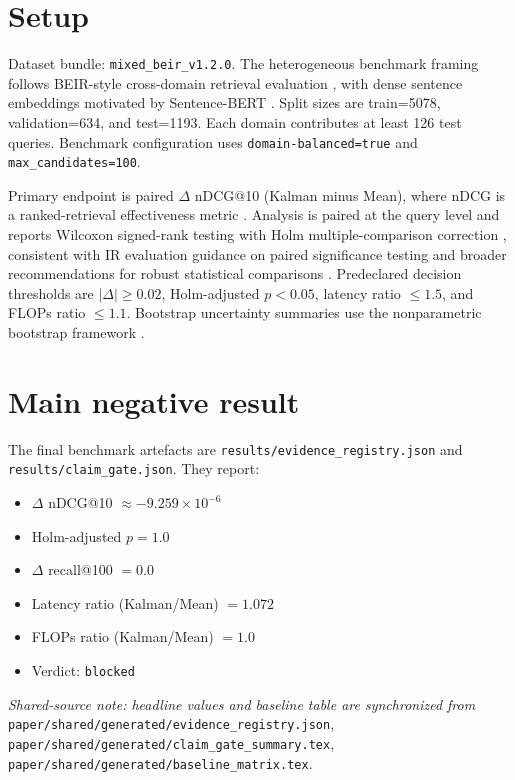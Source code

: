 \documentclass[11pt]{article}
\begin{document}
\section{Setup}
Dataset bundle: \texttt{mixed\_beir\_v1.2.0}. The heterogeneous benchmark framing follows BEIR-style cross-domain retrieval evaluation \cite{thakur2021beir}, with dense sentence embeddings motivated by Sentence-BERT \cite{reimers2019sentencebert}. Split sizes are train=5078, validation=634, and test=1193. Each domain contributes at least 126 test queries. Benchmark configuration uses \texttt{domain-balanced=true} and \texttt{max\_candidates=100}.

Primary endpoint is paired $\Delta$ nDCG@10 (Kalman minus Mean), where nDCG is a ranked-retrieval effectiveness metric \cite{jarvelin2002}. Analysis is paired at the query level and reports Wilcoxon signed-rank testing \cite{wilcoxon1945} with Holm multiple-comparison correction \cite{holm1979}, consistent with IR evaluation guidance on paired significance testing \cite{smucker2007comparison} and broader recommendations for robust statistical comparisons \cite{dror2018hitchhikers,demsar2006statistical}. Predeclared decision thresholds are $|\Delta|\ge 0.02$, Holm-adjusted $p<0.05$, latency ratio $\le 1.5$, and FLOPs ratio $\le 1.1$. Bootstrap uncertainty summaries use the nonparametric bootstrap framework \cite{efron1979bootstrap}.

\section{Main negative result}
The final benchmark artefacts are \texttt{results/evidence\_registry.json} and \texttt{results/claim\_gate.json}. They report:
\begin{itemize}
  \item $\Delta$ nDCG@10 $\approx -9.259\times10^{-6}$
  \item Holm-adjusted $p=1.0$
  \item $\Delta$ recall@100 $=0.0$
  \item Latency ratio (Kalman/Mean) $=1.072$
  \item FLOPs ratio (Kalman/Mean) $=1.0$
  \item Verdict: \texttt{blocked}
\end{itemize}
\textit{Shared-source note: headline values and baseline table are synchronized from} \texttt{paper/shared/generated/evidence\_registry.json}, \texttt{paper/shared/generated/claim\_gate\_summary.tex}, \texttt{paper/shared/generated/baseline\_matrix.tex}.
\end{document}
